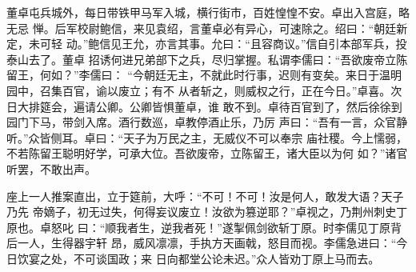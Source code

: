 董卓屯兵城外，每日带铁甲马军入城，横行街市，百姓惶惶不安。卓出入宫庭，略无忌
惮。后军校尉鲍信，来见袁绍，言董卓必有异心，可速除之。绍曰：“朝廷新定，未可轻
动。”鲍信见王允，亦言其事。允曰：“且容商议。”信自引本部军兵，投泰山去了。董卓
招诱何进兄弟部下之兵，尽归掌握。私谓李儒曰：“吾欲废帝立陈留王，何如？”李儒曰：
“今朝廷无主，不就此时行事，迟则有变矣。来日于温明园中，召集百官，谕以废立；有不
从者斩之，则威权之行，正在今日。”卓喜。次日大排筵会，遍请公卿。公卿皆惧董卓，谁
敢不到。卓待百官到了，然后徐徐到园门下马，带剑入席。酒行数巡，卓教停酒止乐，乃厉
声曰：“吾有一言，众官静听。”众皆侧耳。卓曰：“天子为万民之主，无威仪不可以奉宗
庙社稷。今上懦弱，不若陈留王聪明好学，可承大位。吾欲废帝，立陈留王，诸大臣以为何
如？”诸官听罢，不敢出声。

座上一人推案直出，立于筵前，大呼：“不可！不可！汝是何人，敢发大语？天子乃先
帝嫡子，初无过失，何得妄议废立！汝欲为篡逆耶？”卓视之，乃荆州刺史丁原也。卓怒叱
曰：“顺我者生，逆我者死！”遂掣佩剑欲斩丁原。时李儒见丁原背后一人，生得器宇轩
昂，威风凛凛，手执方天画戟，怒目而视。李儒急进曰：“今日饮宴之处，不可谈国政；来
日向都堂公论未迟。”众人皆劝丁原上马而去。

